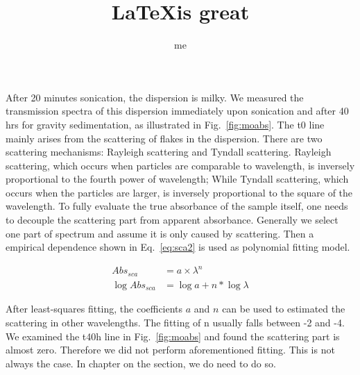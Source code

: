 \documentclass[12pt,oneside]{book}
\begin{document}
  \title{\LaTeX is great}
  \author{me}
  \maketitle


    \begin{singlespace}
    \renewcommand{\glossarypreamble}{\thispagestyle{myheadings}} %
    \printglossary[type=\acronymtype]
    \clearpage
    \end{singlespace}

     


After 20 minutes sonication, the dispersion is milky. We measured the transmission spectra of this dispersion immediately upon sonication and after 40 hrs for gravity sedimentation, as illustrated in Fig.~\ref{fig:moabs}. The t0 line mainly arises from the scattering of flakes in the dispersion. There are two scattering mechanisms: Rayleigh scattering and Tyndall scattering. Rayleigh scattering, which occurs when particles are comparable to wavelength, is inversely proportional to the fourth power of wavelength; While Tyndall scattering, which occurs when the particles are larger, is inversely proportional to the square of the wavelength. To fully evaluate the true absorbance of the sample itself, one needs to decouple the scattering part from apparent absorbance. Generally we select one part of spectrum and assume it is only caused by scattering. Then a empirical dependence shown in Eq.~\ref{eq:sca2} is used as polynomial fitting model.

\begin{align}
Abs_{sca}  & = a\times \lambda^{n}  \label{eq:sca1}\\
\log{Abs_{sca}} & = \log{a} + n*\log{\lambda} \label{eq:sca2}
\end{align}

After least-squares fitting, the coefficients $a$ and $n$ can be used to estimated the scattering in other wavelengths. The fitting of n usually falls between -2 and -4. We examined the t40h line in Fig.~\ref{fig:moabs} and found the scattering part is almost zero. Therefore we did not perform aforementioned fitting. This is not always the case. In chapter on the  section, we do need to do so.
\end{document}
